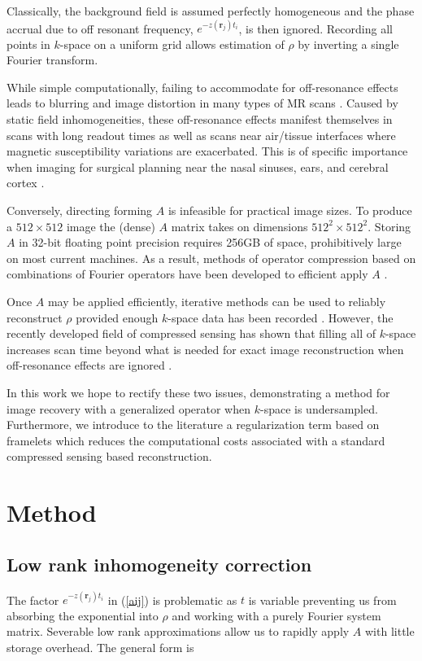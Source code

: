 \documentclass[11pt]{amsart}
\theoremstyle{remark}
\begin{document}
Classically, the background field is assumed perfectly homogeneous and the phase accrual due to off resonant frequency, $e^{-z(\mathbf{r}_j)t_i}$, is then ignored. Recording all points in $k$-space on a uniform grid allows estimation of $\rho$ by inverting a single Fourier transform.

While simple computationally, failing to accommodate for off-resonance effects leads to blurring and image distortion in many types of MR scans \cite{Lai}. Caused by static field inhomogeneities, these off-resonance effects manifest themselves in scans with long readout times as well as scans near air/tissue interfaces where magnetic susceptibility variations are exacerbated. This is of specific importance when imaging for surgical planning near the nasal sinuses, ears, and cerebral cortex \cite{Moerland1995} \cite{Neufeld2005}.

Conversely, directing forming $A$ is infeasible for practical image sizes. To produce a $512 \times 512$ image the (dense) $A$ matrix takes on dimensions $512^2 \times 512^2$. Storing $A$ in 32-bit floating point precision requires 256GB of space, prohibitively large on most current machines. As a result, methods of operator compression based on combinations of Fourier operators have been developed to efficient apply $A$ \cite{Fessler2010}.

Once $A$ may be applied efficiently, iterative methods can be used to reliably reconstruct $\rho$ provided enough $k$-space data has been recorded \cite{Sutton2003}. However, the recently developed field of compressed sensing has shown that filling all of $k$-space increases scan time beyond what is needed for exact image reconstruction when off-resonance effects are ignored \cite{Romberg2007}.

In this work we hope to rectify these two issues, demonstrating a method for image recovery with a generalized operator when $k$-space is undersampled. Furthermore, we introduce to the literature a regularization term based on framelets which reduces the computational costs associated with a standard compressed sensing based reconstruction.



\section{Method}

\subsection{Low rank inhomogeneity correction}
The factor $e^{-z(\mathbf{r}_j)t_i}$ in (\ref{aij}) is problematic as $t$ is variable preventing us from absorbing the exponential into $\rho$ and working with a purely Fourier system matrix. Severable low rank approximations allow us to rapidly apply $A$ with little storage overhead. The general form is 
\end{document}
